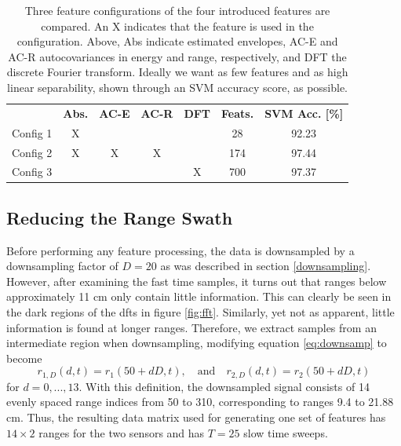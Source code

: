 \begin{table}
\begin{center}
  \begin{tabular}{|c|cccccc|}
\hline
    \rowcolor{gray!150}
		  & \color{white}\textbf{Abs.} & \color{white}\textbf{AC-E} & \color{white}\textbf{AC-R} & \color{white}\textbf{DFT} & \color{white}\textbf{Feats.} & \color{white}\textbf{SVM Acc. [\%]} \\
	  Config 1 & X &   &   &   & 28  & 92.23 \\
	  Config 2 & X & X & X & & 174 & 97.44 \\
	  Config 3 & & & & X & 700 & 97.37 \\
\hline
  \end{tabular}
\end{center}
	\caption{Three feature configurations of the four introduced features are compared. An X indicates that the feature is used in the configuration. Above, Abs indicate estimated envelopes, AC-E and AC-R autocovariances in energy and range, respectively, and DFT the discrete Fourier transform. Ideally we want as few features and as high linear separability, shown through an SVM accuracy score, as possible.} 
\label{tab:feat}
\end{table}



\subsection{Reducing the Range Swath}

Before performing any feature processing, the data is downsampled by a downsampling factor of $D=20$ as was described in section \ref{downsampling}. However, after examining the fast time samples, it turns out that ranges below approximately 11 cm only contain little information. This can clearly be seen in the dark regions of the \gls{dft}s in figure \ref{fig:fft}. Similarly, yet not as apparent, little information is found at longer ranges. Therefore, we extract samples from an intermediate region when downsampling, modifying equation \eqref{eq:downsamp} to become
\begin{equation}
	r_{1,D}(d, t) = r_{1}(50+dD,t), 
	\quad \text{and} \quad r_{2,D}(d,t) = r_{2}(50+dD,t)
\end{equation}
for $d=0,...,13$. With this definition, the downsampled signal consists of 14 evenly spaced range indices from 50 to 310, corresponding to ranges 9.4 to 21.88 cm. Thus, the resulting data matrix used for generating one set of features has $14\times 2$ ranges for the two sensors and has $T=25$ slow time sweeps. 

